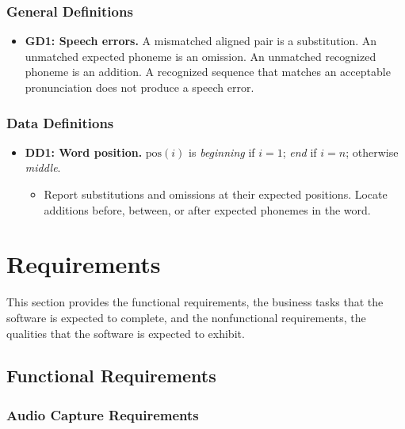 \documentclass[12pt]{article}
\begin{document}
\subsubsection{General Definitions}

\begin{itemize}
\item \textbf{GD1: Speech errors.} A mismatched aligned pair is a substitution. An unmatched expected phoneme is an omission. An unmatched recognized phoneme is an addition. A recognized sequence that matches an acceptable pronunciation does not produce a speech error.
\end{itemize}

\subsubsection{Data Definitions}

\begin{itemize}
\item \textbf{DD1: Word position.} $\mathrm{pos}(i)$ is \textit{beginning} if $i = 1$; \textit{end} if $i = n$; otherwise \textit{middle}.
  \begin{itemize}
  \item Report substitutions and omissions at their expected positions. Locate additions before, between, or after expected phonemes in the word.
  \end{itemize}
\end{itemize}

\section{Requirements} \label{sec:requirements}

This section provides the functional requirements, the business tasks that the
software is expected to complete, and the nonfunctional requirements, the
qualities that the software is expected to exhibit.

\subsection{Functional Requirements} \label{sec:functional-requirements}

\subsubsection{Audio Capture Requirements}
\end{document}
